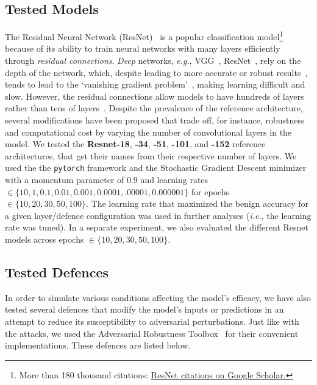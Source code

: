 \subsection{Tested Models}
\label{models}
The Residual Neural Network (ResNet)~\citep{resnet} is a popular classification model\footnote{More than 180 thousand citations: \href{https://scholar.google.com/scholar?cites=9281510746729853742}{ResNet citations on Google Scholar.}} because of its ability to train neural networks with many layers efficiently through \textit{residual connections}.
\textit{Deep} networks, \textit{e.g.}, VGG~\citep{vgg}, ResNet~\citep{resnet}, rely on the depth of the network, which, despite leading to more accurate or robust results~\citep{rolnick2017power, carlini_towards_2017}, tends to lead to the `vanishing gradient problem'~\citep{hochreiter1998vanishing}, making learning difficult and slow. However, the residual connections allow models to have hundreds of layers rather than tens of layers~\citep{resnet,vgg}. Despite the prevalence of the reference architecture, several modifications have been proposed that trade off, for instance, robustness and computational cost by varying the number of convolutional layers in the model. We tested the \textbf{Resnet-18}, \textbf{-34}, \textbf{-51}, \textbf{-101}, and \textbf{-152} reference architectures, that get their names from their respective number of layers. We used the the \texttt{pytorch} framework and the Stochastic Gradient Descent minimizer with a momentum parameter of 0.9 and learning rates $\in \{10, 1, 0.1, 0.01, 0.001, 0.0001, .00001, 0.000001\}$ for epochs $\in \{ 10, 20, 30, 50, 100\}$. The learning rate that maximized the benign accuracy for a given layer/defence configuration was used in further analyses (\textit{i.e.}, the learning rate was tuned). In a separate experiment, we also evaluated the different Resnet models across epochs $\in \{10, 20, 30, 50, 100\}$.

\subsection{Tested Defences}
\label{defences}

In order to simulate various conditions affecting the model's efficacy, we have also tested several defences that modify the model's inputs or predictions in an attempt to reduce its susceptibility to adversarial perturbations. Just like with the attacks, we used the Adversarial Robustness Toolbox~\citep{art2018} for their convenient implementations. These defences are listed below.

